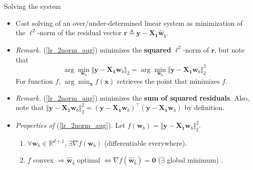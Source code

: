 \documentclass{beamer}
\numberwithin{equation}{section}
\newcommand{\aref}[1]{\alert{\ref{#1}}}
\begin{document}
\begin{frame}{Solving the system}
    \begin{itemize}
        \item
        Cast solving of an over/under-determined linear system as minimization
        of the $ \ell^2 $-norm of the residual vector $ \mathbf{r} \triangleq
        \mathbf{y} - \mathbf{X}_\mathbf{1}\hat{\mathbf{w}}_{\hat{b}} $.

        \item
        \textit{Remark.} (\aref{lr_2norm_aug}) minimizes the \textbf{squared}
        $ \ell^2 $-norm of $ \mathbf{r} $, but note that
        \begin{equation*}
            \arg\min_{\mathbf{w}_b}
            \Vert\mathbf{y} - \mathbf{X}_\mathbf{1}\mathbf{w}_b\Vert_2 =
            \arg\min_{\mathbf{w}_b}
            \Vert\mathbf{y} - \mathbf{X}_\mathbf{1}\mathbf{w}_b\Vert_2^2
        \end{equation*}
        For function $ f $, $ \arg\min_\mathbf{x}f(\mathbf{x}) $ retrieves
        the point that minimizes $ f $.

        \item
        \textit{Remark.} (\aref{lr_2norm_aug}) minimizes the
        \textbf{sum of squared residuals}. Also, note that
        $ \Vert\mathbf{y} - \mathbf{X}_\mathbf{1}\mathbf{w}_b\Vert_2^2 =
        (\mathbf{y} - \mathbf{X}_\mathbf{1}\mathbf{w}_b)^\top(\mathbf{y} -
        \mathbf{X}_\mathbf{1}\mathbf{w}_b) $ by definition.

        \item
        \textit{Properties of }(\aref{lr_2norm_aug}). Let $ f(\mathbf{w}_b) =
        \Vert\mathbf{y} - \mathbf{X}_\mathbf{1}\mathbf{w}_b\Vert_2^2 $.
        \begin{enumerate}
            \item
            $ \forall \mathbf{w}_b \in \mathbb{R}^{d + 1} $,
            $ \exists \nabla f(\mathbf{w}_b) $ (differentiable everywhere).

            \item
            $ f $ convex $ \Rightarrow \hat{\mathbf{w}}_{\hat{b}} $ optimal
            $ \Leftrightarrow \nabla f(\hat{\mathbf{w}}_{\hat{b}}) =
            \mathbf{0} $ ($ \exists $ global minimum) \cite{bv_convex_opt}.
        \end{enumerate}
    \end{itemize}
\end{frame}
\end{document}

